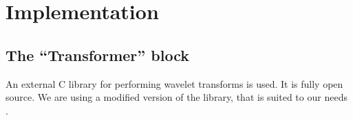 \documentclass[./A14_Report.tex]{subfiles}
\begin{document}
\chapter{Implementation}

\section{The ``Transformer'' block}

An external C library for performing wavelet transforms is used. It is fully
open source. We are using a modified version of the library, that is suited to
our needs \cite{rpwavelib}.
\end{document}
